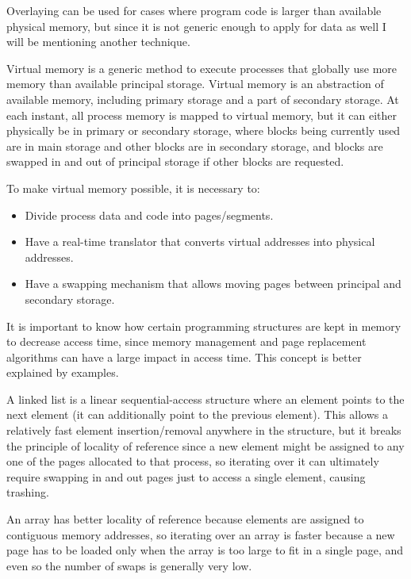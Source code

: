 \documentclass{sope}
\begin{document}
Overlaying can be used for cases where program code is larger than available physical memory, but since it is not generic enough to apply for data as well I will be mentioning another technique.

Virtual memory is a generic method to execute processes that globally use more memory than available principal storage. Virtual memory is an abstraction of available memory, including primary storage and a part of secondary storage. At each instant, all process memory is mapped to virtual memory, but it can either physically be in primary or secondary storage, where blocks being currently used are in main storage and other blocks are in secondary storage, and blocks are swapped in and out of principal storage if other blocks are requested.

To make virtual memory possible, it is necessary to:
\begin{itemize}
    \item Divide process data and code into pages/segments.
    \item Have a real-time translator that converts virtual addresses into physical addresses.
    \item Have a swapping mechanism that allows moving pages between principal and secondary storage.
\end{itemize}

It is important to know how certain programming structures are kept in memory to decrease access time, since memory management and page replacement algorithms can have a large impact in access time. This concept is better explained by examples.

A linked list is a linear sequential-access structure where an element points to the next element (it can additionally point to the previous element). This allows a relatively fast element insertion/removal anywhere in the structure, but it breaks the principle of locality of reference since a new element might be assigned to any one of the pages allocated to that process, so iterating over it can ultimately require swapping in and out pages just to access a single element, causing trashing.

An array has better locality of reference because elements are assigned to contiguous memory addresses, so iterating over an array is faster because a new page has to be loaded only when the array is too large to fit in a single page, and even so the number of swaps is generally very low.
\end{document}
